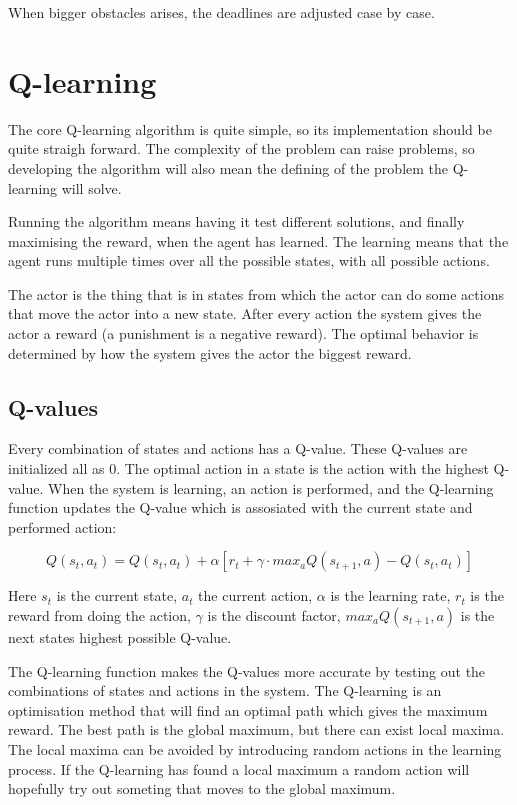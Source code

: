 \documentclass{article}
\begin{document}
When bigger obstacles arises, the deadlines are adjusted case by case.



\section{Q-learning}
The core Q-learning algorithm is quite simple, so its implementation should
be quite straigh forward. The complexity of the problem can raise problems,
so developing the algorithm will also mean the defining of
the problem the Q-learning will solve.

Running the algorithm means having it test different solutions, and finally
maximising the reward, when the agent has learned. The learning means
that the agent runs multiple times over all the possible states,
with all possible actions.

The actor is the thing that is in states from which the actor can do some
actions that move the actor into a new state. After every action the
system gives the actor a reward (a punishment is a negative reward).
The optimal behavior is determined by how the system gives the actor the
biggest reward.


\subsection{Q-values}
Every combination of states and actions has a Q-value. These Q-values are
initialized all as 0. The optimal action in a state is the action with the
highest Q-value. When the system is learning, an action is performed, and the
Q-learning function updates the Q-value which is assosiated with the current
state and performed action:

\[Q(s_t, a_t) = Q(s_t, a_t) + \alpha [ r_t + \gamma \cdot max_aQ(s_{t+1}, a)
- Q(s_t, a_t) ]\]

Here $s_t$ is the current state, $a_t$ the current action,
$\alpha$ is the learning rate, $r_t$ is the reward from doing the action,
$\gamma$ is the discount factor, $max_aQ(s_{t+1}, a)$ is the next states
highest possible Q-value.

The Q-learning function makes the Q-values more accurate by testing out
the combinations of states and actions in the system. The Q-learning is an
optimisation method that will find an optimal path which gives the maximum
reward. The best path is the global maximum, but there can exist local maxima.
The local maxima can be avoided by introducing random actions in the learning
process. If the Q-learning has found a local maximum a random action will
hopefully try out someting that moves to the global maximum.
\end{document}
